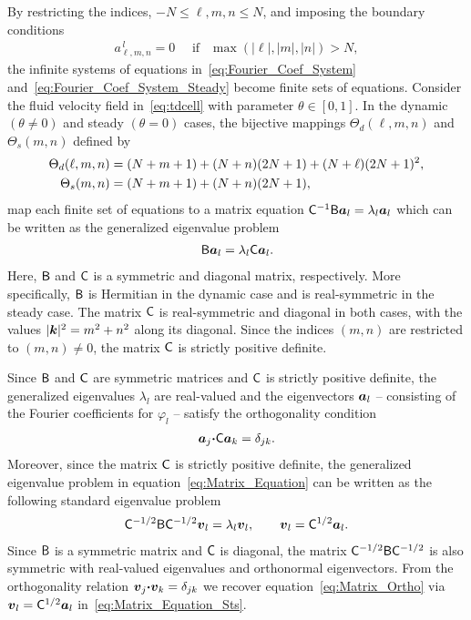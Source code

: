 \documentclass[amsa]{ipart}
\begin{document}
By restricting the indices, $-N\leq \ell,m,n\leq N$, and imposing the boundary
conditions
%
\begin{align}
  a^{\,l}_{\ell,m,n}=0 \quad \text{ if } \ \ \max(|\ell|,|m|,|n|)>N,
\end{align}
%
the infinite systems of equations in~\eqref{eq:Fourier_Coef_System}
and~\eqref{eq:Fourier_Coef_System_Steady} become finite sets of
equations. Consider the fluid velocity field in~\eqref{eq:tdcell} with
parameter $\theta\in[0,1]$. In the dynamic $(\theta\neq0)$ and steady $(\theta=0)$ cases,
the bijective mappings $\Theta_d(\ell,m,n)$ and $\Theta_s(m,n)$ defined by 
%
\begin{align}\label{eq:Bijections}
  \Theta_d(\ell,m,n)&=(N+m+1)+(N+n)(2N+1)+(N+\ell)(2N+1)^2,
  \\
  \Theta_s(m,n)&=(N+m+1)+(N+n)(2N+1),
  \notag
\end{align}
%
map each finite set of equations to a matrix equation
$\mathsf{C}^{-1}\mathsf{B}\boldsymbol{a}_l=\lambda_l\boldsymbol{a}_l$ which can be written as the
generalized eigenvalue problem   
%
\begin{align}\label{eq:Matrix_Equation}
  \Bm\veca_l=\lambda_l \Cm\veca_l.
\end{align}
%
Here, $\mathsf{B}$ and $\mathsf{C}$ is a symmetric and diagonal matrix,
respectively. More specifically, $\mathsf{B}$ is Hermitian in the dynamic
case and is real-symmetric in the steady case. The matrix $\mathsf{C}$ is
real-symmetric and diagonal in both cases, with the values
$|\boldsymbol{k}|^2=m^2+n^2$ along its diagonal. Since the indices $(m,n)$ are 
restricted to $(m,n)\neq0$, the matrix $\mathsf{C}$ is strictly positive definite. 


Since $\mathsf{B}$ and $\mathsf{C}$ are symmetric matrices and $\mathsf{C}$ is strictly
positive definite, the generalized eigenvalues $\lambda_l$ are real-valued
and the eigenvectors $\boldsymbol{a}_l$ -- consisting of the Fourier
coefficients for $\varphi_l$ -- satisfy the orthogonality
condition~\cite{Parlett:1980}     
%
\begin{align}\label{eq:Matrix_Ortho}
  \veca_j\bcdot\Cm\veca_k=\delta_{jk}.
\end{align}
%
Moreover, since the matrix $\mathsf{C}$ is strictly positive definite, the
generalized eigenvalue problem in equation~\eqref{eq:Matrix_Equation}
can be written as the following standard eigenvalue problem 
%
\begin{align}\label{eq:Matrix_Equation_Sts}
  \Cm^{-1/2}\Bm\Cm^{-1/2}\vecv_l=\lambda_l\vecv_l,
  \qquad
  \vecv_l=\Cm^{1/2}\veca_l.
\end{align}
%
Since $\mathsf{B}$ is a symmetric matrix and $\mathsf{C}$ is diagonal, the matrix
$\mathsf{C}^{-1/2}\mathsf{B}\mathsf{C}^{-1/2}$ is also symmetric with real-valued
eigenvalues and orthonormal eigenvectors. From the
orthogonality relation $\boldsymbol{v}_j\mbox{\boldmath${\cdot}$}\boldsymbol{v}_k=\delta_{jk}$ we recover
equation~\eqref{eq:Matrix_Ortho} via $\boldsymbol{v}_l=\mathsf{C}^{1/2}\boldsymbol{a}_l$
in~\eqref{eq:Matrix_Equation_Sts}. 
\end{document}
